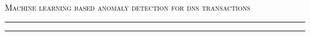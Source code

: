 \begin{center}
\chaptitlefont %
\begin{center}\textcolor{black}{\textsc{Machine learning based anomaly detection for dns transactions}}
\end{center}
\end{center}
\vspace{8mm}
\textcolor{black}{\hrule height 4.5pt}%
\vspace{1mm}
\textcolor{black}{\hrule height 1.5pt}